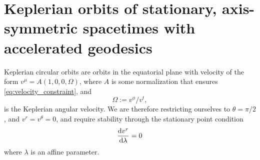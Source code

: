 \section{Keplerian orbits of stationary, axis-symmetric spacetimes with accelerated geodesics}
\label{appendix:circular-orbits}

Keplerian circular orbits are orbits in the equatorial plane with velocity of the form $v^\mu = A(1, 0, 0, \Omega)$, where $A$ is some normalization that ensures \eqref{eq:velocity_constraint}, and
\begin{equation}
    \label{eq:keplerian-angular-velocity}
    \Omega := v^\phi / v^t,
\end{equation}
is the Keplerian angular velocity. We are therefore restricting ourselves to $\theta = \pi/2$, and $v^r = v^\theta = 0$, and require stability through the stationary point condition
\begin{equation}
    \frac{\text{d} v^r}{\text{d} \lambda} = 0
\end{equation}
where $\lambda$ is an affine parameter.

